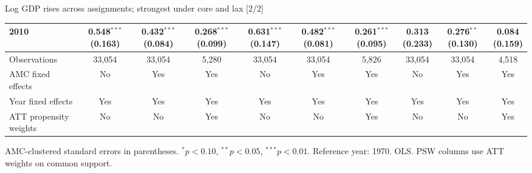 \documentclass[aspectratio=169]{beamer}
\begin{document}
\begin{frame}{Log GDP rises across assignments; strongest under core and lax [2/2]}
{\begin{tabular}{@{}l*{9}{c}@{}}
2010 & \shortstack{0.548$^{***}$\\(0.163)} & \shortstack{0.432$^{***}$\\(0.084)} & \shortstack{0.268$^{***}$\\(0.099)} & \shortstack{0.631$^{***}$\\(0.147)} & \shortstack{0.482$^{***}$\\(0.081)} & \shortstack{0.261$^{***}$\\(0.095)} & \shortstack{0.313\\(0.233)} & \shortstack{0.276$^{**}$\\(0.130)} & \shortstack{0.084\\(0.159)} \\
\midrule
Observations & 33,054 & 33,054 & 5,280 & 33,054 & 33,054 & 5,826 & 33,054 & 33,054 & 4,518 \\
AMC fixed effects & No & Yes & Yes & No & Yes & Yes & No & Yes & Yes \\
Year fixed effects & Yes & Yes & Yes & Yes & Yes & Yes & Yes & Yes & Yes \\
ATT propensity weights & No & No & Yes & No & No & Yes & No & No & Yes \\
\bottomrule
\end{tabular}%
}
\vspace{0.1em}
{\tiny\color{ZMidGray} AMC-clustered standard errors in parentheses. $^{*}p<0.10$, $^{**}p<0.05$, $^{***}p<0.01$. Reference year: 1970. OLS. PSW columns use ATT weights on common support.}
\end{frame}
\end{document}
